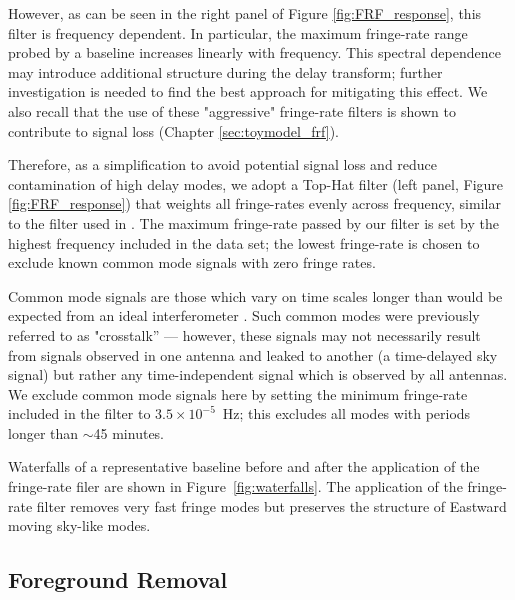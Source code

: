 However, as can be seen in the right panel of Figure \ref{fig:FRF_response}, this filter is frequency dependent.
In particular, the maximum fringe-rate range probed by a baseline increases linearly with frequency.
This spectral dependence may introduce additional structure during the delay transform; further investigation is needed to find the best approach for mitigating this effect.
We also recall that the use of these "aggressive" fringe-rate filters is shown to contribute to signal loss
(Chapter \ref{sec:toymodel_frf}).

Therefore, as a simplification to avoid potential signal loss
and reduce contamination of high delay modes,
we adopt a Top-Hat filter (left panel, Figure \ref{fig:FRF_response})
that weights all fringe-rates evenly across frequency, similar to the filter used in \citet{parsons_et_al2012b}.
The maximum fringe-rate passed by our filter is set
by the highest frequency
included in the data set; the lowest fringe-rate is chosen to exclude known common mode signals with zero fringe
rates.

Common mode signals are those which vary on time scales longer than would be expected from an ideal interferometer \citep{ali_et_al2015}.
Such common modes were previously referred to as
	"crosstalk'' --- however, these signals may not
	necessarily result from signals observed in one antenna and leaked to another
	(a time-delayed sky signal) but rather any time-independent signal which is observed by all antennas. We exclude common mode signals here by setting the minimum fringe-rate included in the filter to $3.5\times10^{-5}$~Hz; this
excludes all modes with periods longer than $\sim$45 minutes.


Waterfalls of a representative baseline
before and after the application of the
fringe-rate filer are shown in Figure~\ref{fig:waterfalls}.
The application of the fringe-rate filter removes very fast
fringe modes but preserves the structure of Eastward moving sky-like modes.

\subsection{Foreground Removal}\label{sec:wida}


